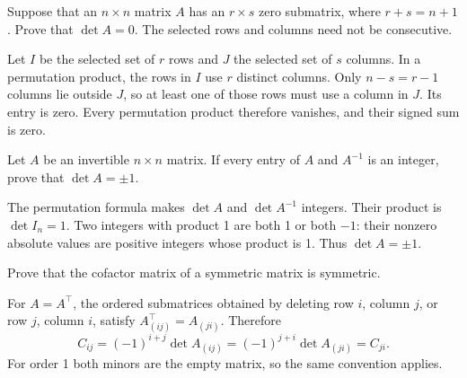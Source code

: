 \begin{problem}\label{ex:05:zero-submatrix}
Suppose that an \(n\times n\) matrix \(A\) has an \(r\times s\) zero
submatrix, where \(r+s=n+1\). Prove that \(\det A=0\).
The selected rows and columns need not be consecutive.
\end{problem}
\begin{solution}
Let \(I\) be the selected set of \(r\) rows and \(J\) the selected set
of \(s\) columns. In a permutation product, the rows in \(I\) use \(r\)
distinct columns. Only \(n-s=r-1\) columns lie outside \(J\), so at least
one of those rows must use a column in \(J\). Its entry is zero.
Every permutation product therefore vanishes, and their signed sum is zero.
\end{solution}

\begin{problem}\label{ex:05:integer-inverse}
Let \(A\) be an invertible \(n\times n\) matrix. If every entry of
\(A\) and \(A^{-1}\) is an integer, prove that \(\det A=\pm1\).
\end{problem}
\begin{solution}
The permutation formula makes \(\det A\) and \(\det A^{-1}\) integers.
Their product is \(\det I_n=1\). Two integers with product 1 are both 1
or both \(-1\): their nonzero absolute values are positive integers whose
product is 1. Thus \(\det A=\pm1\).
\end{solution}

\begin{problem}\label{ex:05:symmetric-cofactors}
Prove that the cofactor matrix of a symmetric matrix is symmetric.
\end{problem}
\begin{solution}
For \(A=A^\top\), the ordered submatrices obtained by deleting row \(i\),
column \(j\), or row \(j\), column \(i\), satisfy
\(A_{(ij)}^\top=A_{(ji)}\). Therefore
\[
C_{ij}=(-1)^{i+j}\det A_{(ij)}
=(-1)^{j+i}\det A_{(ji)}=C_{ji}.
\]
For order 1 both minors are the empty matrix, so the same convention applies.
\end{solution}

